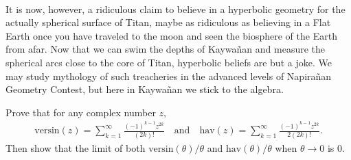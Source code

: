\begin{tcolorbox}[title={Swimming the Depths of the Algebraic Ocean}]
    \\
    It is now, however, a ridiculous claim to believe in a hyperbolic geometry for the actually spherical surface of Titan, maybe as ridiculous as believing in a Flat Earth once you have traveled to the moon and seen the biosphere of the Earth from afar. Now that we can swim the depths of Kaywañan and measure the spherical arcs close to the core of Titan, hyperbolic beliefs are but a joke. We may study mythology of such treacheries in the advanced levels of Napirañan Geometry Contest, but here in Kaywañan we stick to the algebra.
\end{tcolorbox}


\begin{tcolorbox}[title={Maclaurin Series of Versine \& Haversine}]
    \begin{question}
        Prove that for any complex number $z$,
        \begin{align*}
            \text{versin}(z) = \sum _{k=1}^{\infty }{\frac {(-1)^{k-1}z^{2k}}{(2k)!}} \quad \text{and} \quad \text{hav}(z) = \sum _{k=1}^{\infty }{\frac {(-1)^{k-1}z^{2k}}{2(2k)!}}.
        \end{align*}
        Then show that the limit of both $\text{versin}(\theta)/\theta$ and $\text{hav}(\theta)/\theta$ when $\theta \to 0$ is $0$.
    \end{question}
\end{tcolorbox}


